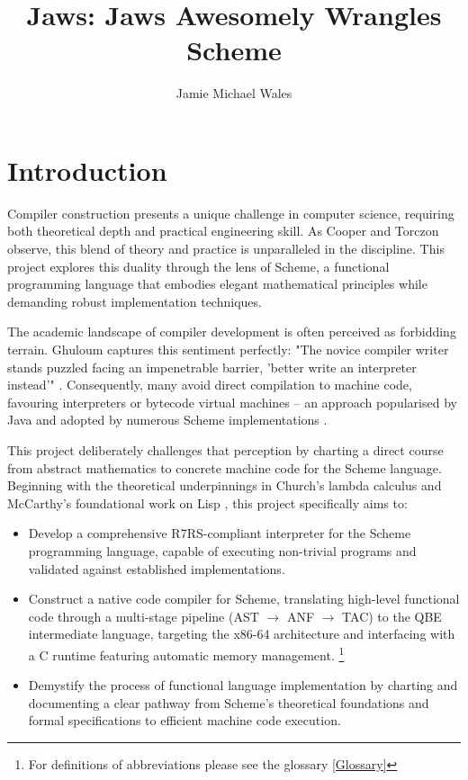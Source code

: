 \documentclass[final]{cmpreport_02}
\title{Jaws: Jaws Awesomely Wrangles Scheme}
\author{Jamie Michael Wales}
\begin{document}
\section{Introduction}

Compiler construction presents a unique challenge in computer science, requiring both theoretical depth and practical engineering skill. As Cooper and Torczon \cite{cooper2011engineering} observe, this blend of theory and practice is unparalleled in the discipline. This project explores this duality through the lens of Scheme, a functional programming language that embodies elegant mathematical principles while demanding robust implementation techniques.\newline

The academic landscape of compiler development is often perceived as forbidding terrain. Ghuloum captures this sentiment perfectly: "The novice compiler writer stands puzzled facing an impenetrable barrier, 'better write an interpreter instead'" \cite{ghuloum2006incremental}. Consequently, many avoid direct compilation to machine code, favouring interpreters or bytecode virtual machines – an approach popularised by Java \cite{oracle2024java} and adopted by numerous Scheme implementations \cite{SchemeImplementations}.\newline

This project deliberately challenges that perception by charting a direct course from abstract mathematics to concrete machine code for the Scheme language. Beginning with the theoretical underpinnings in Church's lambda calculus \cite{church1936unsolvable} and McCarthy's foundational work on Lisp \cite{mccarthy1960recursive}, this project specifically aims to:
\begin{itemize}[noitemsep]
    \item Develop a comprehensive R7RS-compliant interpreter for the Scheme programming language, capable of executing non-trivial programs and validated against established implementations.
    \item Construct a native code compiler for Scheme, translating high-level functional code through a multi-stage pipeline (AST $\rightarrow$ ANF $\rightarrow$ TAC) to the QBE intermediate language, targeting the x86-64 architecture and interfacing with a C runtime featuring automatic memory management. \footnote{For definitions of abbreviations please see the glossary \ref{Glossary}  }
    \item Demystify the process of functional language implementation by charting and documenting a clear pathway from Scheme's theoretical foundations and formal specifications to efficient machine code execution.
\end{itemize}
\end{document}
